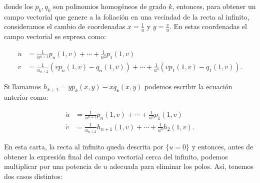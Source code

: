 \noindent donde los $p_{k},q_{k}$ son polinomios homogéneos de grado $k$, entonces, para obtener un campo vectorial que genere a la foliación en una vecindad de la recta al infinito, consideramos el cambio de coordenadas $x=\tfrac{1}{u}$ y $y=\tfrac{v}{u}$. En estas coordenadas el campo vectorial se expresa como:

\begin{equation}
\begin{aligned}
\dot{u} &=\frac{1}{u^{n+1}}p_{n}(1,v)+\cdots+\frac{1}{u^{2}}p_{1}(1,v)\\
\dot{v} &=\frac{1}{u_{n+2}}(vp_{n}(1,v)-q_{n}(1,v))+\cdots+\frac{1}{u^{3}}(vp_{1}(1,v)-q_{1}(1,v)).
\end{aligned}
\end{equation}

Si llamamos $h_{k+1}=yp_{k}(x,y)-xq_{k}(x,y)$ podemos escribir la ecuación anterior como:

\begin{equation}
\label{EcuacionEnCP2Infinito}
\begin{aligned}
\dot{u} &=\frac{1}{u^{n+1}}p_{n}(1,v)+\cdots+\frac{1}{u^{2}}p_{1}(1,v)\\
\dot{v} &=\frac{1}{u_{n+2}}h_{n+1}(1,v)+\cdots+\frac{1}{u^{3}}h_{2}(1,v).
\end{aligned}
\end{equation}

En esta carta, la recta al infinito queda descrita por $\{u=0\}$ y entonces, antes de obtener la expresión final del campo vectorial cerca del infinito, podemos multiplicar por una potencia de $u$ adecuada para eliminar los polos. Así, tenemos dos casos distintos:


